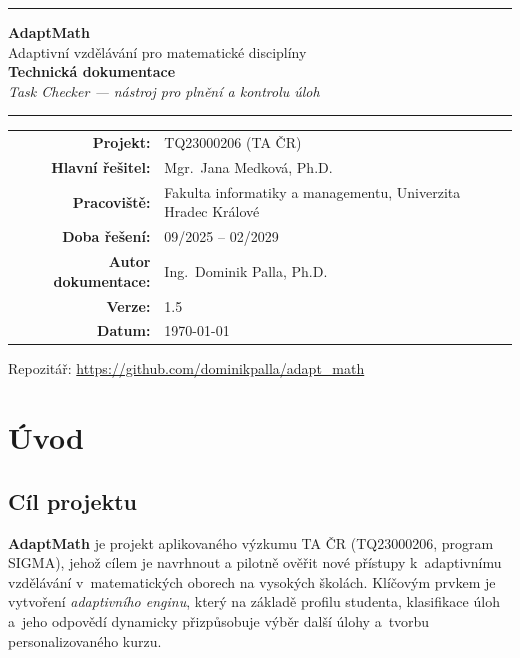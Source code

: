 \documentclass[11pt,a4paper]{article}
\begin{document}
\begin{titlepage}
  \centering
  \vspace*{2cm}
  {\color{orange}\rule{\linewidth}{2pt}}
  \vspace{1.5cm}

  {\Huge\bfseries AdaptMath}\\[0.4cm]
  {\Large Adaptivní vzdělávání pro matematické disciplíny}\\[1cm]

  {\large\bfseries Technická dokumentace}\\[0.6cm]
  {\itshape Task Checker --- nástroj pro plnění a kontrolu úloh}\\

  \vspace{2cm}
  {\color{orange}\rule{\linewidth}{1pt}}
  \vspace{0.8cm}

  \begin{tabular}{rl}
    \textbf{Projekt:} & TQ23000206 (TA ČR) \\[3pt]
    \textbf{Hlavní řešitel:} & Mgr.~Jana Medková, Ph.D. \\[3pt]
    \textbf{Pracoviště:} & Fakulta informatiky a managementu, Univerzita Hradec Králové \\[3pt]
    \textbf{Doba řešení:} & 09/2025 -- 02/2029 \\[3pt]
    \textbf{Autor dokumentace:} & Ing.~Dominik Palla, Ph.D. \\[3pt]
    \textbf{Verze:} & 1.5 \\[3pt]
    \textbf{Datum:} & \today \\
  \end{tabular}

  \vfill
  {\small Repozitář: \url{https://github.com/dominikpalla/adapt_math}}
\end{titlepage}

\tableofcontents
\newpage

\section{Úvod}

\subsection{Cíl projektu}

\textbf{AdaptMath} je projekt aplikovaného výzkumu TA ČR (\textsc{TQ23000206}, program SIGMA), jehož cílem je navrhnout a pilotně ověřit nové přístupy k~adaptivnímu vzdělávání v~matematických oborech na vysokých školách. Klíčovým prvkem je vytvoření \emph{adaptivního enginu}, který na základě profilu studenta, klasifikace úloh a~jeho odpovědí dynamicky přizpůsobuje výběr další úlohy a~tvorbu personalizovaného kurzu.
\end{document}
